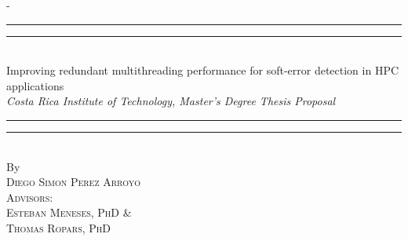 %
%
% 
%
%
\begin{titlingpage}
\begin{SingleSpace}
\calccentering{\unitlength} 
\begin{adjustwidth*}{\unitlength}{-\unitlength}
\vspace*{13mm}
\begin{center}
\rule[0.5ex]{\linewidth}{2pt}\vspace*{-\baselineskip}\vspace*{3.2pt}
\rule[0.5ex]{\linewidth}{1pt}\\[\baselineskip]
{\huge Improving redundant multithreading performance for soft-error detection in HPC applications}\\[4mm]
{\Large \textit{Costa Rica Institute of Technology, Master's Degree Thesis Proposal}}\\
\rule[0.5ex]{\linewidth}{1pt}\vspace*{-\baselineskip}\vspace{3.2pt}
\rule[0.5ex]{\linewidth}{2pt}\\
\vspace{6.5mm}
{\large By}\\
\vspace{6.5mm}
{\large\textsc{Diego Simon Perez Arroyo \\\vspace{0.5cm} Advisors:\\ Esteban Meneses, PhD \& \\ Thomas Ropars, PhD }}\\

\end{center}
\end{adjustwidth*}
\end{SingleSpace}
\end{titlingpage}
